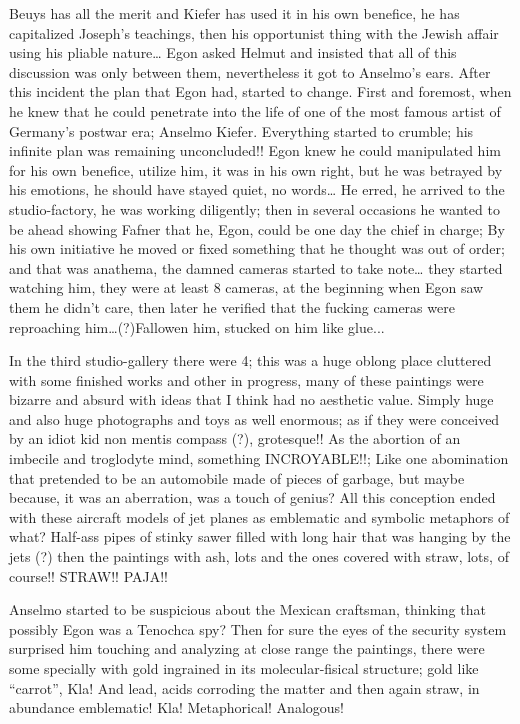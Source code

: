 \documentclass[smalldemyvopaper,11pt,twoside,onecolumn,openright,extrafontsizes]{memoir}
\begin{document}
Beuys has all the merit and Kiefer has used it in his own benefice, he has capitalized Joseph’s teachings, then his opportunist thing with the Jewish affair using his pliable nature… Egon asked Helmut and insisted that all of this discussion was only between them, nevertheless it got to Anselmo’s ears. After this incident the plan that Egon had, started to change. First and foremost, when he knew that he could penetrate into the life of one of the most famous artist of Germany’s postwar era; Anselmo Kiefer. Everything started to crumble; his infinite plan was remaining unconcluded!! Egon knew he could manipulated him for his own benefice, utilize him, it was in his own right, but he was betrayed by his emotions, he should have stayed quiet, no words… He erred, he arrived to the studio-factory, he was working diligently; then in several occasions he wanted to be ahead showing Fafner that he, Egon, could be one day the chief in charge; By his own initiative he moved or fixed something that he thought was out of order; and that was anathema, the damned cameras started to take note… they started watching him, they were at least 8 cameras, at the beginning when Egon saw them he didn’t care, then later he verified that the fucking cameras were reproaching him…(?)Fallowen him, stucked on him like glue...

In the third studio-gallery there were 4; this was a huge oblong place cluttered with some finished works and other in progress, many of these paintings were bizarre and absurd with ideas that I think had no aesthetic value. Simply huge and also huge photographs and toys as well enormous; as if they were conceived by an idiot kid non mentis compass (?), grotesque!! As the abortion of an imbecile and troglodyte mind, something INCROYABLE!!; Like one abomination that pretended to be an automobile made of pieces of garbage, but maybe because, it was an aberration, was a touch of genius? All this conception ended with these aircraft models of jet planes as emblematic and symbolic metaphors of what? Half-ass pipes of stinky sawer filled with long hair that was hanging by the jets (?) then the paintings with ash, lots and the ones covered with straw, lots, of course!! STRAW!! PAJA!!

Anselmo started to be suspicious about the Mexican craftsman, thinking that possibly Egon was a Tenochca spy? Then for sure the eyes of the security system surprised him touching and analyzing at close range the paintings, there were some specially with gold ingrained in its molecular-fisical structure; gold like “carrot”, Kla! And lead, acids corroding the matter and then again straw, in abundance emblematic! Kla! Metaphorical! Analogous!
\end{document}
